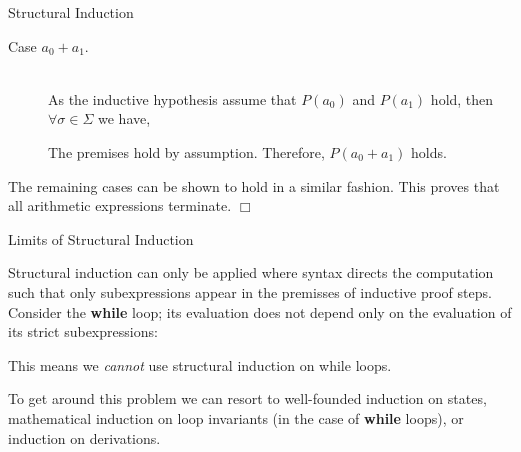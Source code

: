 \documentclass{beamer}
\begin{document}
\begin{frame}{Structural Induction}

\scriptsize

\begin{description}
\item[Case $a_0 + a_1$.]\hspace{.1in}\\ 
As the inductive hypothesis assume that $P(a_0)$ and $P(a_1)$ hold, then $\forall \sigma \in \Sigma$ we have,
\begin{prooftree}
\end{prooftree}
The premises hold by assumption.  Therefore, $P(a_0 + a_1)$ holds.
\end{description} 
The remaining cases can be shown to hold in a similar fashion. 
This proves that all arithmetic expressions terminate. $\Box$
\end{frame}

\begin{frame}{Limits of Structural Induction}

\small
Structural induction can only be applied where syntax directs the computation such that only subexpressions appear in the premisses of inductive proof steps.
Consider the {\bf while} loop; its evaluation does not depend 
only on the evaluation of its strict subexpressions:

\begin{prooftree}
\end{prooftree}
This means we {\em cannot} use structural induction on while loops.

\vspace{.1in}

To get around this problem we can resort to well-founded induction on states, mathematical induction on
loop invariants  (in the case of {\bf while} loops), or induction on derivations.
\end{frame}
\end{document}
